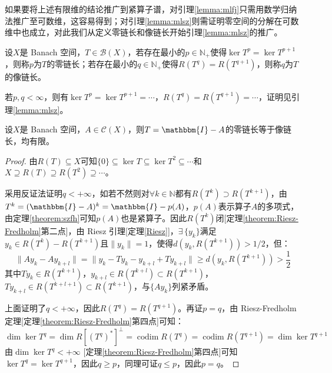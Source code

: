 如果要将上述有限维的结论推广到紧算子谱，对引理\ref{lemma:mlfj}只需用数学归纳法推广至可数维，这容易得到；对引理\ref{lemma:mlsz}则需证明零空间的分解在可数维中也成立，对此我们从定义零链长和像链长开始引理\ref{lemma:mlsz}的推广。
\begin{definition}
设$X$是 Banach 空间，$T \in \mathscr{B}(X)$，若存在最小的$p \in \mathbb{N}_+$使得$\ker T^p=\ker T^{p+1}$，则称$p$为$T$的零链长；若存在最小的$q \in \mathbb{N}_+$使得$R(T^q)=R(T^{q+1})$，则称$q$为$T$的像链长。
\end{definition}
\begin{remark}
\quad 若$p,q<\infty$，则有$\ker T^p=\ker T^{p+1}=\cdots$，$R(T^q)=R(T^{q+1})=\cdots$，证明见引理\ref{lemma:mlsz}。
\end{remark}
\begin{lemma}
设$X$是 Banach 空间，$A \in \mathscr{C}(X)$，则$T=\mathbbm{I}-A$的零链长等于像链长，均有限。
\end{lemma}
\begin{proof}
由$R(T) \subseteq X$可知$\{0\} \subseteq \ker T \subseteq \ker T^2 \subseteq \cdots$和$X \supseteq R(T) \supseteq R(T^2) \supseteq \cdots$。

采用反证法证明$q<+\infty$，如若不然则对$\forall k \in \mathbb{N}$都有$R(T^k) \supset R(T^{k+1})$，由$T^k=(\mathbbm{I}-A)^k=\mathbbm{I}-p(A)$，$p(A)$表示算子$A$的多项式，由定理\ref{theorem:szfh}可知$p(A)$也是紧算子。因此$R(T^k)$闭[定理\ref{theorem:Riesz-Fredholm}第二点]，由 Riesz 引理[定理\ref{Riesz}]，$\exists \, \{y_k\}$满足$y_k \in R(T^k)-R(T^{k+1})$且$\|y_k\|=1$，使得$d(y_k,R(T^{k+1}))>1/2$，但：
\[\|Ay_k-Ay_{k+l}\|=\|y_k-Ty_k-y_{k+l}+Ty_{k+l}\|\geq d(y_k,R(T^{k+1}))>\frac{1}{2}\]
其中$Ty_k \in R(T^{k+1})$，$y_{k+l} \in R(T^{k+l}) \subset R(T^{k+1})$，$Ty_{k+l} \in R(T^{k+l+1}) \subset R(T^{k+1})$，与$\{Ay_k\}$列紧矛盾。

上面证明了$q<+\infty$，因此$R(T^q)=R(T^{q+1})$。再证$p=q$，由 Riesz-Fredholm 定理[定理\ref{theorem:Riesz-Fredholm}第四点]可知：
\[\dim\ker T^q=\dim R[(T^q)^*]^{\perp}=\operatorname{codim}R(T^q)=\operatorname{codim}R(T^{q+1})=\dim\ker T^{q+1}\]
由$\dim\ker T^q<+\infty$ [定理\ref{theorem:Riesz-Fredholm}第四点]可知$\ker T^q=\ker T^{q+1}$，因此$q \geq p$，同理可证$q \leq p$，因此$p=q$。
\end{proof}


